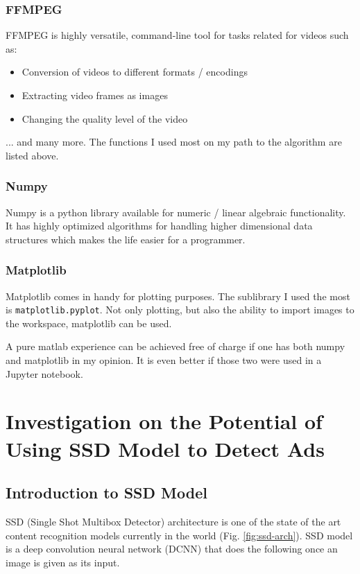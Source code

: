 \subsubsection{FFMPEG}

FFMPEG is highly versatile, command-line tool for tasks related for videos such as:

\begin{itemize}
\item Conversion of videos to different formats / encodings
\item Extracting video frames as images
\item Changing the quality level of the video
\end{itemize}

... and many more. The functions I used most on my path to the algorithm are listed above.

\subsubsection{Numpy}

Numpy is a python library available for numeric / linear algebraic functionality. It has highly optimized algorithms for handling higher dimensional data structures which makes the life easier for a programmer. 

\subsubsection{Matplotlib}

Matplotlib comes in handy for plotting purposes. The sublibrary I used the most is \texttt{matplotlib.pyplot}. Not only plotting, but also the ability to  import images to the workspace, matplotlib can be used.

A pure matlab experience can be achieved free of charge if one has both numpy and matplotlib in my opinion. It is even better if those two were used in a Jupyter notebook.


\section{Investigation on the Potential of Using SSD Model to Detect Ads}

\subsection{Introduction to SSD Model}
SSD (Single Shot Multibox Detector) architecture is one of the state of the art content recognition models currently in the world (Fig. \ref{fig:ssd-arch}). SSD model is a deep convolution neural network (DCNN) that does the following once an image is given as its input.

